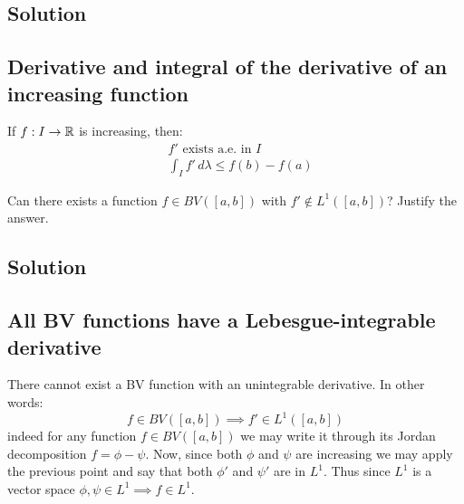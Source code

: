 \subsection*{Solution}

\subsection[]{Derivative and integral of the derivative of an increasing function}
If $f:I\to\mathbb{R}$ is increasing, then:
\begin{align*}
    & f' \text{ exists a.e. in } I \\
    & \int_I f' \, d\lambda \leq f(b)-f(a)
\end{align*}


\question
Can there exists a function $f \in BV ([a, b])$ with $f'\not\in L^1([a, b])$? Justify the answer.

\subsection*{Solution}

\subsection{All BV functions have a Lebesgue-integrable derivative}
There cannot exist a BV function with an unintegrable derivative. In other words:
\[
    f \in BV([a,b]) \implies f' \in L^1([a,b])
\]
indeed for any function $f\in BV([a,b])$ we may write it through its Jordan decomposition $f=\phi-\psi$. Now, since both $\phi$ and $\psi$ are increasing we may apply the previous point and say that both $\phi'$ and $\psi'$ are in $L^1$. Thus since $L^1$ is a vector space $\phi,\psi\in L^1 \implies f\in L^1$.
